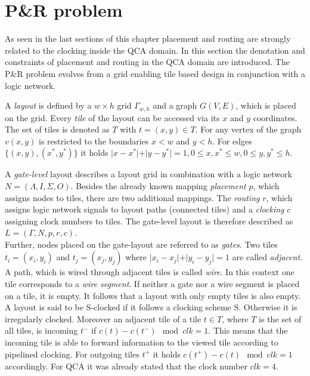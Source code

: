 \section{P\&R problem} \label{sec:PR}

As seen in the last sections of this chapter placement and routing are strongly related to the clocking inside the QCA domain. In this section the denotation and constraints of placement and routing in the QCA domain are introduced. The P\&R problem evolves from a grid enabling tile based design in conjunction with a logic network.

\begin{definition}
	A \textit{layout} is defined by a $w \times h$ grid $\Gamma_{w, h}$ and a graph $G(V, E)$, which is placed on the grid. Every \textit{tile} of the layout can be accessed via its $x$ and $y$ coordinates. The set of tiles is denoted as $T$ with $t = (x, y) \in T$. For any vertex of the graph $v(x, y)$ is restricted to the boundaries $x < w$ and $y < h$. For edges $\{(x, y), (x^*, y^*)\}$ it holds $\vert x-x^*\vert+\vert y-y^*\vert = 1, 0 \leq x, x^* \leq w, 0 \leq y, y^* \leq h$.
\end{definition}

\begin{definition}
	A \textit{gate-level} layout describes a layout grid in combination with a logic network $N = (\Lambda, I, \Sigma, O)$. Besides the already known mapping \textit{placement} $p$, which assigns nodes to tiles, there are two additional mappings. The \textit{routing} $r$, which assigns logic network signals to layout paths (connected tiles) and a \textit{clocking} $c$ assigning clock numbers to tiles. The gate-level layout is therefore described as $L = (\Gamma, N, p, r, c)$.\\
	Further, nodes placed on the gate-layout are referred to as \textit{gates}. Two tiles $t_i = (x_i, y_i)$ and $t_j = (x_j, y_j)$ where $\vert x_i-x_j\vert+\vert y_i-y_j\vert = 1$ are called \textit{adjacent}. A path, which is wired through adjacent tiles is called \textit{wire}. In this context one tile corresponds to a \textit{wire segment}. If neither a gate nor a wire segment is placed on a tile, it is empty. It follows that a layout with only empty tiles is also empty. A layout is said to be S-clocked if it follows a clocking scheme S. Otherwise it is irregularly clocked. Moreover an adjacent tile of a tile $t \in T$, where $T$ is the set of all tiles, is incoming $t^-$ if $c(t) - c(t^-) \mod{clk} = 1$. This means that the incoming tile is able to forward information to the viewed tile according to pipelined clocking. For outgoing tiles $t^+$ it holds $c(t^+) - c(t) \mod{clk} = 1$ accordingly. For QCA it was already stated that the clock number $clk = 4$.\\
\end{definition}

